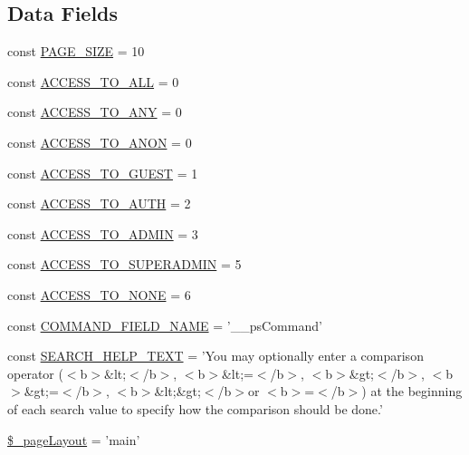 \subsection*{Data Fields}
\begin{DoxyCompactItemize}
\item 
const \hyperlink{classCPSController_a4634a091c35db33009455321e1d259e3}{PAGE\_\-SIZE} = 10
\item 
const \hyperlink{classCPSController_ab269679ab48227854fa6fa0a6d344324}{ACCESS\_\-TO\_\-ALL} = 0
\item 
const \hyperlink{classCPSController_a8b17406db740d630ae61ecf3cd9bbd8c}{ACCESS\_\-TO\_\-ANY} = 0
\item 
const \hyperlink{classCPSController_abc512a8f331daed89e84a7d8f44775c4}{ACCESS\_\-TO\_\-ANON} = 0
\item 
const \hyperlink{classCPSController_aaef8a39bfe4d39dca0f45fdb837a8d59}{ACCESS\_\-TO\_\-GUEST} = 1
\item 
const \hyperlink{classCPSController_a437b41cb9e13e41157d57e7736366295}{ACCESS\_\-TO\_\-AUTH} = 2
\item 
const \hyperlink{classCPSController_a16a362e48c9f7e6757bb15e0a3d9fa4f}{ACCESS\_\-TO\_\-ADMIN} = 3
\item 
const \hyperlink{classCPSController_a91cdb5f485c387235bfbd09b1bb132bb}{ACCESS\_\-TO\_\-SUPERADMIN} = 5
\item 
const \hyperlink{classCPSController_a63d56389fe1e58d0b097471ca4f4dc00}{ACCESS\_\-TO\_\-NONE} = 6
\item 
const \hyperlink{classCPSController_acfa3d37fd2964302d32a8905a102196d}{COMMAND\_\-FIELD\_\-NAME} = '\_\-\_\-psCommand'
\item 
const \hyperlink{classCPSController_a21930d5a45a39f983d1b157fd28819dc}{SEARCH\_\-HELP\_\-TEXT} = 'You may optionally enter a comparison operator ($<$b$>$\&lt;$<$/b$>$, $<$b$>$\&lt;=$<$/b$>$, $<$b$>$\&gt;$<$/b$>$, $<$b$>$\&gt;=$<$/b$>$, $<$b$>$\&lt;\&gt;$<$/b$>$or $<$b$>$=$<$/b$>$) at the beginning of each search value to specify how the comparison should be done.'
\item 
\hyperlink{classCPSController_a112cfb0eb5096b5a3d03c88d0aa1fa50}{\$\_\-pageLayout} = 'main'
\end{DoxyCompactItemize}
